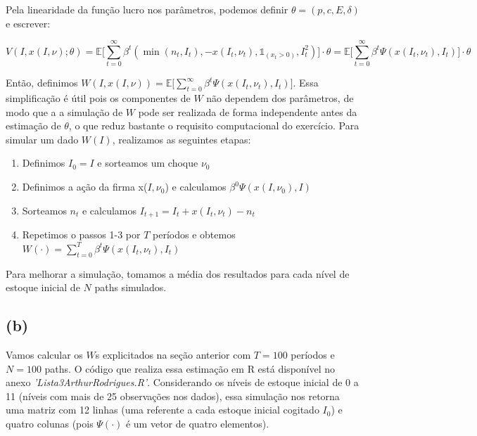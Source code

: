\documentclass{article}
\begin{document}
Pela linearidade da função lucro nos parâmetros, podemos definir $\theta = (p,c,E,\delta)$ e escrever:

\begin{equation*}
    V(I,x(I,\nu);\theta)= \mathbb{E}\bigg[\sum_{t=0}^\infty\beta^t \left(  \min(n_t,I_t), -x(I_t, \nu_t), \mathds{1}_{(x_t>0)}, I_t^2 \right) \bigg] \cdot \theta = \mathbb{E}\bigg[\sum_{t=0}^\infty\beta^t \Psi(x(I_t, \nu_t), I_t) \bigg] \cdot \theta
\end{equation*}

Então, definimos $W(I,x(I,\nu)) = \mathbb{E}\bigg[\sum_{t=0}^\infty\beta^t \Psi(x(I_t, \nu_t), I_t) \bigg]$. Essa simplificação é útil pois os componentes de $W$ não dependem dos parâmetros, de modo que a a simulação de $W$ pode ser realizada de forma independente antes da estimação de $\theta$, o que reduz bastante o requisito computacional do exercício. Para simular um dado $W(I)$, realizamos as seguintes etapas:

\begin{enumerate}
    \item Definimos $I_0 = I$ e sorteamos um choque $\nu_0$
    \item Definimos a ação da firma x($I,\nu_0$) e calculamos $\beta^0 \Psi(x(I, \nu_0), I)$
    \item Sorteamos $n_t$ e calculamos $I_{t+1} = I_t + x(I_t,\nu_t) - n_t$
    \item Repetimos o passos 1-3 por $T$ períodos e obtemos $W(\cdot) = \sum_{t=0}^T\beta^t \Psi(x(I_t, \nu_t), I_t)$
\end{enumerate}

Para melhorar a simulação, tomamos a média dos resultados para cada nível de estoque inicial de $N$ paths simulados.

\subsection*{(b)}

Vamos calcular os $W$s explicitados na seção anterior com $T = 100$ períodos e $N = 100$ paths. O código que realiza essa estimação em R está disponível no anexo \textit{'Lista3ArthurRodrigues.R'}. Considerando os níveis de estoque inicial de 0 a 11 (níveis com mais de 25 observações nos dados), essa simulação nos retorna uma matriz com 12 linhas (uma referente a cada estoque inicial cogitado $I_0$) e quatro colunas (pois $\Psi(\cdot)$ é um vetor de quatro elementos).
\end{document}
